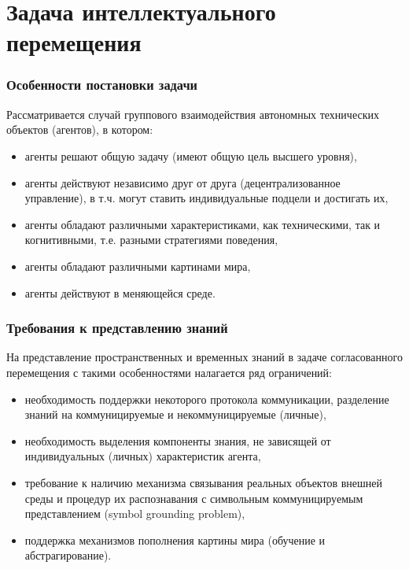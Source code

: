 \documentclass[default]{beamer}
\begin{document}
	\section{Задача интеллектуального перемещения}
	\begin{frame}
		\frametitle{Особенности постановки задачи}
		
		Рассматривается случай группового взаимодействия автономных технических объектов (агентов), в котором:
		\begin{itemize}
			\item агенты решают общую задачу (имеют общую цель высшего уровня),
			\item агенты действуют независимо друг от друга (децентрализованное управление), в т.ч. могут ставить индивидуальные подцели и достигать их,
			\item агенты обладают различными характеристиками, как техническими, так и когнитивными, т.е. разными стратегиями поведения,
			\item агенты обладают различными картинами мира,
			\item агенты действуют в меняющейся среде.
		\end{itemize}
		
	\end{frame}
	
	\begin{frame}
		\frametitle{Требования к представлению знаний}
		
		На представление пространственных и временных знаний в задаче согласованного перемещения с такими особенностями налагается ряд ограничений:
		\begin{itemize}
			\item необходимость поддержки некоторого протокола коммуникации, разделение знаний на коммуницируемые и некоммуницируемые (личные),
			\item необходимость выделения компоненты знания, не зависящей от индивидуальных (личных) характеристик агента,
			\item требование к наличию механизма связывания реальных объектов внешней среды и процедур их распознавания с символьным коммуницируемым представлением (symbol grounding problem),
			\item поддержка механизмов пополнения картины мира (обучение и абстрагирование).
		\end{itemize}
	\end{frame}
	
\end{document}
